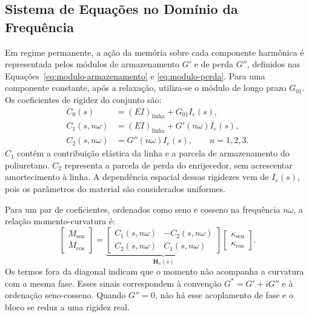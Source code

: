 \documentclass[arial,centeredequations,english,brazilian,oneside,section=TITLE]{ifes8}
\begin{document}
\subsection{Sistema de Equações no Domínio da Frequência}
\label{sec:governo-linear-frequencia}

Em regime permanente, a ação da memória sobre cada componente harmônica é
representada pelos módulos de armazenamento $G'$ e de perda $G''$, definidos
nas Equações~\eqref{eq:modulo-armazenamento} e \eqref{eq:modulo-perda}.
Para uma componente constante, após a relaxação, utiliza-se o módulo de longo
prazo $G_{01}$. Os coeficientes de rigidez do conjunto são:
\begin{align}
  C_0(s)&=(EI)_{\mathrm{linha}}+G_{01}I_e(s),
    \label{eq:rigidez-constante-linear}\\
  C_1(s,n\omega)&=(EI)_{\mathrm{linha}}+G'(n\omega)I_e(s),
    \label{eq:rigidez-armazenamento-linear}\\
  C_2(s,n\omega)&=G''(n\omega)I_e(s),\qquad n=1,2,3.
    \label{eq:rigidez-perda-linear}
\end{align}
$C_1$ contém a contribuição elástica da linha e a parcela de armazenamento do
poliuretano. $C_2$ representa a parcela de perda do enrijecedor, sem acrescentar
amortecimento à linha. A dependência espacial dessas rigidezes vem de $I_e(s)$,
pois os parâmetros do material são considerados uniformes.

Para um par de coeficientes, ordenados como seno e cosseno na frequência
$n\omega$, a relação momento-curvatura é:
\begin{equation}
  \begin{bmatrix}M_{\mathrm{sen}}\\ M_{\mathrm{cos}}\end{bmatrix}
  =\underbrace{\begin{bmatrix}
    C_1(s,n\omega)&-C_2(s,n\omega)\\
    C_2(s,n\omega)& C_1(s,n\omega)
  \end{bmatrix}}_{\mathbf H_n(s)}
  \begin{bmatrix}\kappa_{\mathrm{sen}}\\ \kappa_{\mathrm{cos}}\end{bmatrix}.
  \label{eq:bloco-rigidez-harmonico}
\end{equation}
Os termos fora da diagonal indicam que o momento não acompanha a curvatura
com a mesma fase. Esses sinais correspondem à convenção
$G^*=G'+iG''$ e à ordenação seno-cosseno. Quando $G''=0$, não há esse
acoplamento de fase e o bloco se reduz a uma rigidez real.
\end{document}
